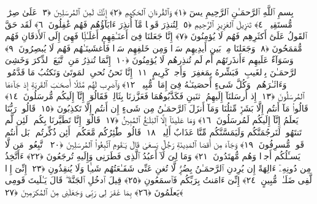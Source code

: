
  
    
  
    
    

\nopagebreak
  بِسمِ ٱللَّهِ ٱلرَّحمَـٰنِ ٱلرَّحِيمِ
  يسٓ ﴿١﴾
 وَٱلقُرءَانِ ٱلحَكِيمِ ﴿٢﴾
 إِنَّكَ لَمِنَ ٱلمُرسَلِينَ ﴿٣﴾
 عَلَىٰ صِرَٰطٍۢ مُّستَقِيمٍۢ ﴿٤﴾
 تَنزِيلَ ٱلعَزِيزِ ٱلرَّحِيمِ ﴿٥﴾
 لِتُنذِرَ قَومًۭا مَّآ أُنذِرَ ءَابَآؤُهُم فَهُم غَٰفِلُونَ ﴿٦﴾
 لَقَد حَقَّ ٱلقَولُ عَلَىٰٓ أَكثَرِهِم فَهُم لَا يُؤمِنُونَ ﴿٧﴾
 إِنَّا جَعَلنَا فِىٓ أَعنَـٰقِهِم أَغلَـٰلًۭا فَهِىَ إِلَى ٱلأَذقَانِ فَهُم مُّقمَحُونَ ﴿٨﴾
 وَجَعَلنَا مِنۢ بَينِ أَيدِيهِم سَدًّۭا وَمِن خَلفِهِم سَدًّۭا فَأَغشَينَـٰهُم فَهُم لَا يُبصِرُونَ ﴿٩﴾
 وَسَوَآءٌ عَلَيهِم ءَأَنذَرتَهُم أَم لَم تُنذِرهُم لَا يُؤمِنُونَ ﴿١٠﴾
 إِنَّمَا تُنذِرُ مَنِ ٱتَّبَعَ ٱلذِّكرَ وَخَشِىَ ٱلرَّحمَـٰنَ بِٱلغَيبِ ۖ فَبَشِّرهُ بِمَغفِرَةٍۢ وَأَجرٍۢ كَرِيمٍ ﴿١١﴾
 إِنَّا نَحنُ نُحىِ ٱلمَوتَىٰ وَنَكتُبُ مَا قَدَّمُوا۟ وَءَاثَـٰرَهُم ۚ وَكُلَّ شَىءٍ أَحصَينَـٰهُ فِىٓ إِمَامٍۢ مُّبِينٍۢ ﴿١٢﴾
 وَٱضرِب لَهُم مَّثَلًا أَصحَـٰبَ ٱلقَريَةِ إِذ جَآءَهَا ٱلمُرسَلُونَ ﴿١٣﴾
 إِذ أَرسَلنَآ إِلَيهِمُ ٱثنَينِ فَكَذَّبُوهُمَا فَعَزَّزنَا بِثَالِثٍۢ فَقَالُوٓا۟ إِنَّآ إِلَيكُم مُّرسَلُونَ ﴿١٤﴾
 قَالُوا۟ مَآ أَنتُم إِلَّا بَشَرٌۭ مِّثلُنَا وَمَآ أَنزَلَ ٱلرَّحمَـٰنُ مِن شَىءٍ إِن أَنتُم إِلَّا تَكذِبُونَ ﴿١٥﴾
 قَالُوا۟ رَبُّنَا يَعلَمُ إِنَّآ إِلَيكُم لَمُرسَلُونَ ﴿١٦﴾
 وَمَا عَلَينَآ إِلَّا ٱلبَلَـٰغُ ٱلمُبِينُ ﴿١٧﴾
 قَالُوٓا۟ إِنَّا تَطَيَّرنَا بِكُم ۖ لَئِن لَّم تَنتَهُوا۟ لَنَرجُمَنَّكُم وَلَيَمَسَّنَّكُم مِّنَّا عَذَابٌ أَلِيمٌۭ ﴿١٨﴾
 قَالُوا۟ طَٰٓئِرُكُم مَّعَكُم ۚ أَئِن ذُكِّرتُم ۚ بَل أَنتُم قَومٌۭ مُّسرِفُونَ ﴿١٩﴾
 وَجَآءَ مِن أَقصَا ٱلمَدِينَةِ رَجُلٌۭ يَسعَىٰ قَالَ يَـٰقَومِ ٱتَّبِعُوا۟ ٱلمُرسَلِينَ ﴿٢٠﴾
 ٱتَّبِعُوا۟ مَن لَّا يَسـَٔلُكُم أَجرًۭا وَهُم مُّهتَدُونَ ﴿٢١﴾
 وَمَا لِىَ لَآ أَعبُدُ ٱلَّذِى فَطَرَنِى وَإِلَيهِ تُرجَعُونَ ﴿٢٢﴾
 ءَأَتَّخِذُ مِن دُونِهِۦٓ ءَالِهَةً إِن يُرِدنِ ٱلرَّحمَـٰنُ بِضُرٍّۢ لَّا تُغنِ عَنِّى شَفَـٰعَتُهُم شَيـًۭٔا وَلَا يُنقِذُونِ ﴿٢٣﴾
 إِنِّىٓ إِذًۭا لَّفِى ضَلَـٰلٍۢ مُّبِينٍ ﴿٢٤﴾
 إِنِّىٓ ءَامَنتُ بِرَبِّكُم فَٱسمَعُونِ ﴿٢٥﴾
 قِيلَ ٱدخُلِ ٱلجَنَّةَ ۖ قَالَ يَـٰلَيتَ قَومِى يَعلَمُونَ ﴿٢٦﴾
 بِمَا غَفَرَ لِى رَبِّى وَجَعَلَنِى مِنَ ٱلمُكرَمِينَ ﴿٢٧﴾
